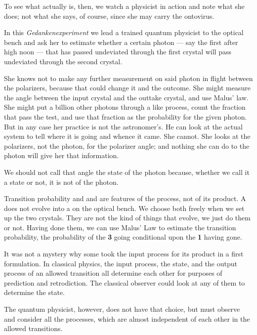 \documentclass[a4paper,11pt]{article}
\begin{document}
To see what \myHighlight{$\psi$}\coordHE{} actually is, then,
we watch a physicist in action
and note what she does;
not what she says,
of course,
since she may carry the ontovirus.

In this {\em Gedankenexperiment}  
we lead a trained quantum physicist
to the optical bench and ask her
 to estimate whether a certain photon
--- say the first after high noon ---
that has passed undeviated through the first crystal will pass
undeviated through the second crystal.

She knows not to make any further  
 measurement
on said photon
in flight  between the polarizers,
because that could change it and the outcome.
She might measure the angle \myHighlight{$\theta$}\coordHE{} between the input crystal
and the outtake crystal, and use Malus' law.
She might put a billion other
photons through a like process,
count the fraction that pass the test,
and use that fraction as the probability for the given photon.
But in any case her practice is not the astronomer's.
He can  look at the actual system to tell where it is going and whence it came.
She cannot.
She looks at the polarizers,
not the photon, for the polarizer angle;
and nothing she can do to the photon
will give her that information.

We should not call that angle the state of the photon
because, 
whether we call it a state or not,
it is not of the photon.

Transition probability and \coordHE{} and \coordHE{}
are features of the process, 
not of its product.
A \myHighlight{$\psi$}\coordHE{} does not evolve into a \myHighlight{$\phi$}\coordHE{}
on the optical bench.
We choose  both freely 
when we set up the two crystals.
They are not the kind of things that evolve,
we just do them or not.
Having done them,
we can use Malus' Law to estimate the transition probability,
the probability of the {\bf 3} going conditional upon the {\bf 1} having gone.


It was not a mystery
why some took the input process  for its product
in a first formulation.
In classical physics,
the input process, the state, and the output process
of an allowed transition
all determine each other
for purposes of  prediction and retrodiction.
The classical observer could look at any of them
to determine the state.

The quantum physicist, however,
 does not have that choice,
but must observe and consider
all the processes,
which are almost independent of each other
in the allowed transitions.
\end{document}
